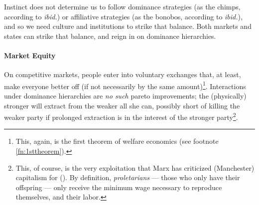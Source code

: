 Instinct does not determine us to follow dominance strategies (as the chimps, according to \emph{ibid.}) or affiliative strategies (as the bonobos, according to \emph{ibid.}), and so we need culture and institutions to strike that balance. Both markets and states can strike that balance, and reign in on dominance hierarchies.

\paragraph{Market Equity}  \label{sec:marketequity} On competitive markets, people enter into voluntary exchanges that, at least, make everyone better off (if not necessarily by the same amount)\footnote{
	This, again, is the first theorem of welfare economics (see footnote \ref{fn:1sttheorem}).}. 
Interactions under dominance hierarchies are \emph{no such} pareto improvements; the (physically) stronger will extract from the weaker all she can, possibly short of killing the weaker party if prolonged extraction is in the interest of the stronger party\footnote{
	This, of course, is the very exploitation that Marx has criticized (Manchester) capitalism for (\citeyear{MarxEngels-1848-aa,Marx-1867-aa}). By definition, \emph{proletarians} --- those who only have their offspring --- only receive the minimum wage necessary to reproduce themselves, and their labor.}.

